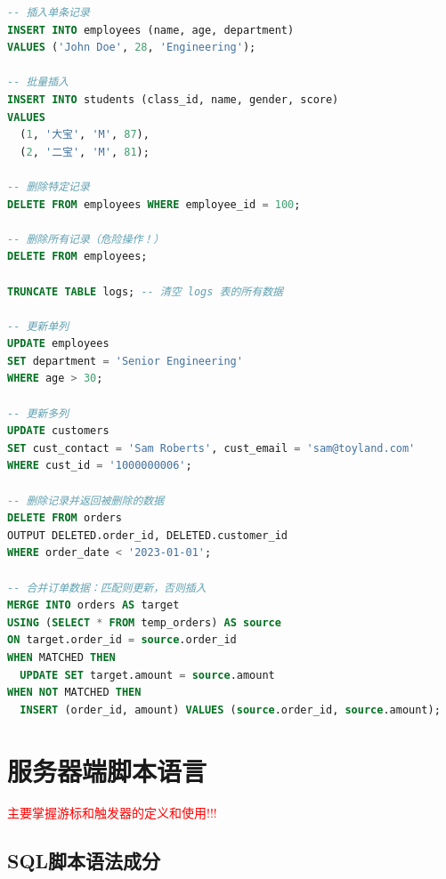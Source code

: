 \begin{lstlisting}[language=SQL]
-- 插入单条记录
INSERT INTO employees (name, age, department) 
VALUES ('John Doe', 28, 'Engineering');

-- 批量插入
INSERT INTO students (class_id, name, gender, score) 
VALUES 
  (1, '大宝', 'M', 87),
  (2, '二宝', 'M', 81);

-- 删除特定记录
DELETE FROM employees WHERE employee_id = 100;

-- 删除所有记录（危险操作！）
DELETE FROM employees;

TRUNCATE TABLE logs; -- 清空 logs 表的所有数据

-- 更新单列
UPDATE employees 
SET department = 'Senior Engineering' 
WHERE age > 30;

-- 更新多列
UPDATE customers 
SET cust_contact = 'Sam Roberts', cust_email = 'sam@toyland.com'
WHERE cust_id = '1000000006';

-- 删除记录并返回被删除的数据
DELETE FROM orders 
OUTPUT DELETED.order_id, DELETED.customer_id
WHERE order_date < '2023-01-01';

-- 合并订单数据：匹配则更新，否则插入
MERGE INTO orders AS target
USING (SELECT * FROM temp_orders) AS source
ON target.order_id = source.order_id
WHEN MATCHED THEN 
  UPDATE SET target.amount = source.amount
WHEN NOT MATCHED THEN 
  INSERT (order_id, amount) VALUES (source.order_id, source.amount);
\end{lstlisting}

\section{服务器端脚本语言}

\textcolor{red}{主要掌握游标和触发器的定义和使用!!!}

\subsection{SQL脚本语法成分}

